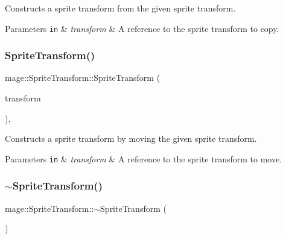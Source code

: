 Constructs a sprite transform from the given sprite transform.


\begin{DoxyParams}[1]{Parameters}
\mbox{\tt in}  & {\em transform} & A reference to the sprite transform to copy. \\
\hline
\end{DoxyParams}
\mbox{\label{classmage_1_1_sprite_transform_a320698bf4095c5886256bd17e32a6e3f}} 
\subsubsection{\texorpdfstring{Sprite\+Transform()}{SpriteTransform()}\hspace{0.1cm}{\footnotesize\ttfamily [4/4]}}
{\footnotesize\ttfamily mage\+::\+Sprite\+Transform\+::\+Sprite\+Transform (\begin{DoxyParamCaption}\item[{\mbox{\hyperlink{classmage_1_1_sprite_transform}{Sprite\+Transform}} \&\&}]{transform }\end{DoxyParamCaption})\hspace{0.3cm}{\ttfamily [default]}, {\ttfamily [noexcept]}}

Constructs a sprite transform by moving the given sprite transform.


\begin{DoxyParams}[1]{Parameters}
\mbox{\tt in}  & {\em transform} & A reference to the sprite transform to move. \\
\hline
\end{DoxyParams}
\mbox{\label{classmage_1_1_sprite_transform_a14a3614023996cbb071c3de99f9528bc}} 
\subsubsection{\texorpdfstring{$\sim$\+Sprite\+Transform()}{~SpriteTransform()}}
{\footnotesize\ttfamily mage\+::\+Sprite\+Transform\+::$\sim$\+Sprite\+Transform (\begin{DoxyParamCaption}{ }\end{DoxyParamCaption})\hspace{0.3cm}{\ttfamily [default]}}

